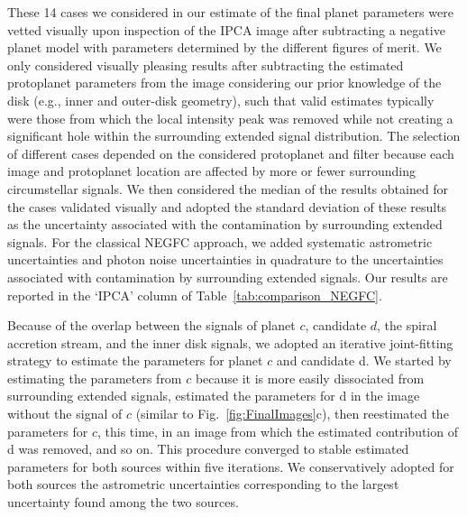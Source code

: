 \documentclass[longauth]{aa}
\begin{document}
\begin{appendix}
These 14 cases we considered in our estimate of the final planet parameters were vetted visually upon inspection of the IPCA image after subtracting a negative planet model with parameters determined by the different figures of merit. 
We only considered visually pleasing results after subtracting the estimated protoplanet parameters from the image considering our prior knowledge of the disk (e.g., inner and outer-disk geometry), such that valid estimates typically were those from which the local intensity peak was removed while not creating a significant hole within the surrounding extended signal distribution.
The selection of different cases depended on the considered protoplanet and filter because each image and protoplanet location are affected by more or fewer surrounding circumstellar signals.
We then considered the median of the results obtained for the cases validated visually and adopted the standard deviation of these results as the uncertainty associated with the contamination by surrounding extended signals.
For the classical NEGFC approach, we added systematic astrometric uncertainties and photon noise uncertainties in quadrature to the uncertainties associated with contamination by surrounding extended signals.
Our results are reported in the `IPCA' column of Table~\ref{tab:comparison_NEGFC}.

Because of the overlap between the signals of planet $c$, candidate $d$, the spiral accretion stream, and the inner disk signals, we adopted an iterative joint-fitting strategy to estimate the parameters for planet $c$ and candidate d. We started by estimating the parameters from $c$ because it is more easily dissociated from surrounding extended signals, estimated the parameters for d in the image without the signal of $c$ (similar to Fig.~\ref{fig:FinalImages}c), then reestimated the parameters for $c$, this time, in an image from which the estimated contribution of d was removed, and so on. This procedure converged to stable estimated parameters for both sources within five iterations. We conservatively adopted for both sources the astrometric uncertainties corresponding to the largest uncertainty found among the two sources.


\end{appendix}
\end{document}
